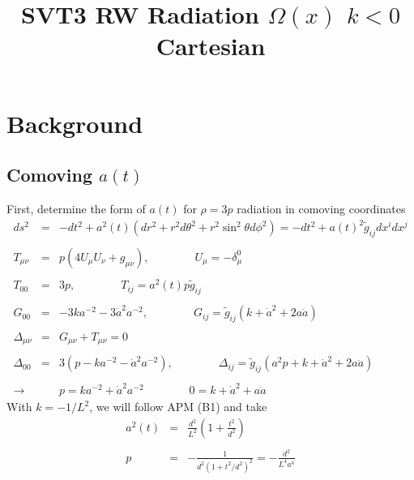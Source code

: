 \documentclass[10pt,letterpaper]{article}
\title{SVT3 RW Radiation $\Omega(x)$ $k<0$ Cartesian}
\date{}
\numberwithin{equation}{section}
\begin{document}
 
\maketitle
\noindent 
\section{Background}

\subsection{Comoving $a(t)$}
First, determine the form of $a(t)$ for $\rho = 3p$ radiation in comoving coordinates
\begin{eqnarray}
ds^2 &=& -dt^2 + a^2(t)(dr^2 + r^2d\theta^2 + r^2\sin^2\theta d\phi^2) = -dt^2 + a(t)^2 \tilde g_{ij} dx^i dx^j
\\ \nonumber\\
T_{\mu\nu} &=& p(4U_\mu U_\nu + g_{\mu\nu}),\qquad\qquad U_\mu = -\delta^0_\mu
\\ \nonumber\\
T_{00} &=& 3p,\qquad\qquad T_{ij} = a^2(t)p \tilde g_{ij}
\\ \nonumber\\
G_{00} &=& -3k a^{-2} -3 \dot a^2 a^{-2},\qquad\qquad G_{ij} = \tilde g_{ij}(k + \dot a^2 + 2 a \ddot a)
\\ \nonumber\\
\Delta_{\mu\nu} &=& G_{\mu\nu}+ T_{\mu\nu} = 0
\\ \nonumber\\
\Delta_{00} &=& 3( p- ka^{-2} -\dot a^2 a^{-2}), \qquad\qquad
\Delta_{ij} = \tilde g_{ij}( a^2 p +k + \dot a^2 + 2a \ddot a)
\\ \nonumber\\
\to  &&\boxed{p= k a^{-2} + \dot a^2 a^{-2}}
\qquad\qquad \boxed{0= k + \dot a^2 + a\ddot a}
\end{eqnarray}
With $k=-1/L^2$, we will follow APM (B1) and take 
\begin{eqnarray}
a^2(t) &=& \frac{d^2}{L^2}\left( 1+ \frac{t^2}{d^2}\right)
\label{a(t)}
\\ \nonumber\\
p &=& -\frac{1}{d^2(1+t^2/d^2)^2} = -\frac{d^2}{L^4 a^4}
\label{pressure1}
\end{eqnarray}

\end{document}
